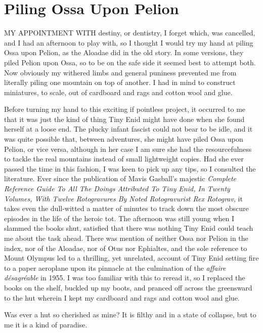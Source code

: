 \chapter{Piling Ossa Upon Pelion}

MY APPOINTMENT WITH destiny, or dentistry, I forget which, was cancelled, and I had an afternoon to play with, so I thought I would try my hand at piling Ossa upon Pelion, as the Aloadae did in the old story. In some versions, they piled Pelion upon Ossa, so to be on the safe side it seemed best to attempt both. Now obviously my withered limbs and general puniness prevented me from literally piling one mountain on top of another. I had in mind to construct miniatures, to scale, out of cardboard and rags and cotton wool and glue.

Before turning my hand to this exciting if pointless project, it occurred to me that it was just the kind of thing Tiny Enid might have done when she found herself at a loose end. The plucky infant fascist could not bear to be idle, and it was quite possible that, between adventures, she might have piled Ossa upon Pelion, or vice versa, although in her case I am sure she had the resourcefulness to tackle the real mountains instead of small lightweight copies. Had she ever passed the time in this fashion, I was keen to pick up any tips, so I consulted the literature. Ever since the publication of Mavis Gasball's majestic \emph{Complete Reference Guide To All The Doings Attributed To Tiny Enid, In Twenty Volumes, With Twelve Rotogravures By Noted Rotogravurist Rex Rotograv}, it takes even the dull-witted a matter of minutes to track down the most obscure episodes in the life of the heroic tot. The afternoon was still young when I slammed the books shut, satisfied that there was nothing Tiny Enid could teach me about the task ahead. There was mention of neither Ossa nor Pelion in the index, nor of the Aloadae, nor of Otus nor Ephialtes, and the sole reference to Mount Olympus led to a thrilling, yet unrelated, account of Tiny Enid setting fire to a paper aeroplane upon its pinnacle at the culmination of the \emph{affaire d\'{e}sagr\'{e}able} in 1955. I was too familiar with this to reread it, so I replaced the books on the shelf, buckled up my boots, and pranced off across the greensward to the hut wherein I kept my cardboard and rags and cotton wool and glue.

Was ever a hut so cherished as mine? It is filthy and in a state of collapse, but to me it is a kind of paradise.

